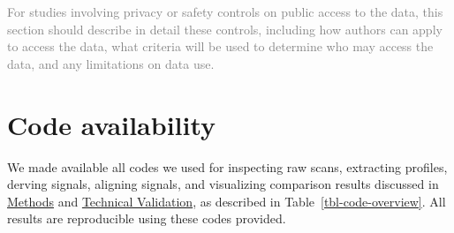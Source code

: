 \documentclass[fleqn,10pt]{wlscirep}
\begin{document}
\textcolor{gray}{For studies involving privacy or safety controls on public access to the data, this section should describe in detail these controls, including how authors can apply to access the data, what criteria will be used to determine who may access the data, and any limitations on data use.}
\fi

\section*{Code availability}\label{sec-code-availability}

We made available all codes we used for inspecting raw scans, extracting
profiles, derving signals, aligning signals, and visualizing comparison
results discussed in \hyperref[sec-methods]{Methods} and
\hyperref[sec-technical-validation]{Technical Validation}, as described
in Table~\ref{tbl-code-overview}. All results are reproducible using
these codes provided.
\end{document}
